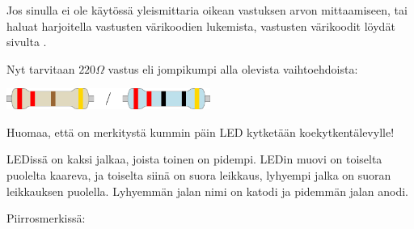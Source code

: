 \begin{tcolorbox}[title=Vastuksen arvo]
Jos sinulla ei ole käytössä yleismittaria oikean vastuksen arvon mittaamiseen, tai haluat harjoitella vastusten värikoodien lukemista, vastusten värikoodit löydät sivulta \pageref{varikoodit}.

Nyt tarvitaan $220\Omega$ vastus eli jompikumpi alla olevista vaihtoehdoista:

\begin{center}
\includegraphics[width=0.5\textwidth]{kuvat/220.pdf}
\end{center}
\end{tcolorbox}

\begin{tcolorbox}[title=LEDin kytkeminen,colback=blue!10,colbacktitle=purple!90]\label{box:led}
Huomaa, että on merkitystä kummin päin LED kytketään koekytkentälevylle! 

LEDissä on kaksi jalkaa, joista toinen on pidempi. LEDin muovi on toiselta puolelta kaareva, ja toiselta siinä on suora leikkaus, lyhyempi jalka on suoran leikkauksen puolella. Lyhyemmän jalan nimi on katodi ja pidemmän jalan anodi.

\begin{minipage}{0.5\textwidth}
Piirrosmerkissä:
\begin{center}
\end{center}
\end{minipage}
\begin{minipage}{0.5\textwidth}
\end{minipage}


\end{tcolorbox}
